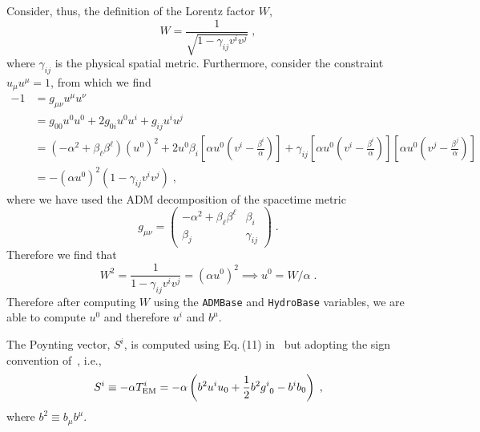 Consider, thus, the definition of the Lorentz factor $W$,
\begin{equation}
  W = \frac{1}{\sqrt{1-\gamma_{ij}v^{i}v^{j}}}\;,
\end{equation}
where $\gamma_{ij}$ is the physical spatial metric. Furthermore,
consider the constraint $u_{\mu}u^{\mu}=1$, from which we find
\begin{equation}
  \begin{split}
    -1 &= g_{\mu\nu}u^{\mu}u^{\nu}\\
       &= g_{00}u^{0}u^{0} + 2g_{0i}u^{0}u^{i} + g_{ij}u^{i}u^{j}\\
       &= \left(-\alpha^{2}+\beta_{\ell}\beta^{\ell}\right)\left(u^{0}\right)^{2}
        + 2u^{0}\beta_{i}\left[\alpha u^{0}\left(v^{i}-\frac{\beta^{i}}{\alpha}\right)\right]
        + \gamma_{ij}\left[\alpha u^{0}\left(v^{i}-\frac{\beta^{i}}{\alpha}\right)\right]\left[\alpha u^{0}\left(v^{j}-\frac{\beta^{j}}{\alpha}\right)\right]\\
       &= -\left(\alpha u^{0}\right)^{2}\left(1 - \gamma_{ij}v^{i}v^{j}\right)\;,
  \end{split}
\end{equation}
where we have used the ADM decomposition of the spacetime metric
\begin{equation}
  g_{\mu\nu} =
  \begin{pmatrix}
    -\alpha^{2}+\beta_{\ell}\beta^{\ell} & \beta_{i}\\
    \beta_{j} & \gamma_{ij}
  \end{pmatrix}\;.
\end{equation}
Therefore we find that
\begin{equation}
  W^{2} = \frac{1}{1-\gamma_{ij}v^{i}v^{j}} = \left(\alpha
  u^{0}\right)^{2} \implies u^{0} = W/\alpha\;.
\end{equation}
Therefore after computing $W$ using the \texttt{ADMBase} and
\texttt{HydroBase} variables, we are able to compute $u^{0}$ and
therefore $u^{i}$ and $b^{\mu}$.

The Poynting vector, $S^{i}$, is computed using Eq.\,(11)
in~\cite{kelly2017prompt} but adopting the sign convention
of~\cite{farris2012binary}, i.e.,
\begin{equation}
  S^{i} \equiv -\alpha T^{i}_{\rm EM} = -\alpha\left(b^{2}u^{i}u_{0} +
  \frac{1}{2}b^{2}g^{i}_{\ 0} - b^{i}b_{0}\right)\;,
\end{equation}
where $b^{2}\equiv b_{\mu}b^{\mu}$.


